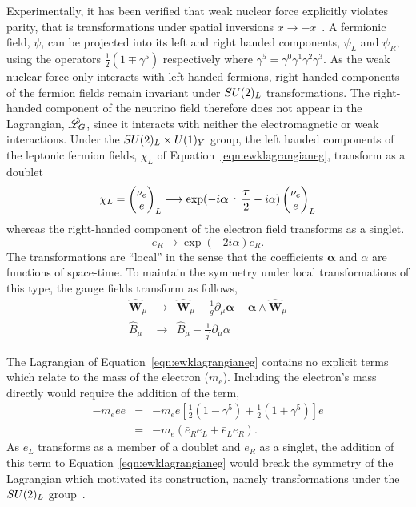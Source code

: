 Experimentally, it has been verified that weak nuclear force explicitly violates
parity, that is transformations under spatial inversions $x\rightarrow -x$~\citep{null}.
A fermionic field, $\psi$, can be projected into its left and right handed components, 
$\psi_{L}$ and $\psi_{R}$, using the operators $\frac{1}{2}(1\mp\gamma^{5})$ respectively 
where $\gamma^{5} = \gamma^{0}\gamma^{1}\gamma^{2}\gamma^{3}$. 
As the weak nuclear force only interacts with left-handed fermions, 
right-handed components of the fermion fields remain invariant under $SU(2)_{L}$ transformations.
The right-handed component of the neutrino field therefore does not appear 
in the Lagrangian, $\hat{\mathscr{L}}_{G}$, since it interacts with neither the electromagnetic or weak interactions.
Under the $SU(2)_{L}\times U(1)_{Y}$ group, 
the left handed components of the leptonic fermion fields,
$\chi_{L}$ of Equation~\ref{eqn:ewklagrangianeg}, transform as a doublet
\begin{equation}
\chi_{L}  =   
\everymath{\displaystyle} \begin{pmatrix}
\nu_{e} \\ 
e
\end{pmatrix}_{L}
 \longrightarrow 
\exp(-i\boldsymbol\alpha\cdot\frac{\boldsymbol\tau}{2} - i\alpha) 
\begin{pmatrix}
\nu_{e} \\ 
e
\end{pmatrix}_{L}
\end{equation}
\label{eqn:doublettrans}
whereas the right-handed component of the electron field transforms as a singlet.  
\begin{equation}
e_{R}
 \longrightarrow 
\exp(-2i{\alpha}) 
e_{R}.
\end{equation}
The transformations are ``local'' in the sense that the coefficients  
$\boldsymbol{\alpha}$ and $\alpha$ are functions of space-time. 
To maintain the symmetry under local transformations of this type, the gauge fields
transform as follows, 
\begin{eqnarray}
\hat{\mathbf{W}}_{\mu} & 
 \longrightarrow & 
\hat{\mathbf{W}}_{\mu} - \frac{1}{g}\partial_{\mu}\boldsymbol{\alpha} 
	- \boldsymbol{\alpha}\wedge\hat{\mathbf{W}}_{\mu} \\
\hat{{B}}_{\mu} & 
 \longrightarrow & 
\hat{{B}}_{\mu} - \frac{1}{g^{\prime}}\partial_{\mu}{\alpha} 
\end{eqnarray}

The Lagrangian of Equation~\ref{eqn:ewklagrangianeg} contains no explicit terms which 
relate to the mass of the electron ($m_{e}$). Including the electron's mass directly would 
require the addition of the term,
\begin{eqnarray}
-m_{e}\bar{e}e  &=& -m_{e}\bar{e}\left[\frac{1}{2}\left(1-\gamma^{5}\right) 
		    + \frac{1}{2}\left(1+\gamma^{5}\right)\right]e \nonumber \\
		&=& -m_{e}\left(\bar{e}_{R}e_{L} + \bar{e}_{L}e_{R}\right).
\end{eqnarray}
As $e_{L}$ transforms as a member of a doublet and $e_{R}$ as a singlet, 
the addition of this term to Equation~\ref{eqn:ewklagrangianeg} 
would break the symmetry of the Lagrangian which motivated its construction, 
namely transformations under the $SU(2)_{L}$ group~\citep{aitchison}.

